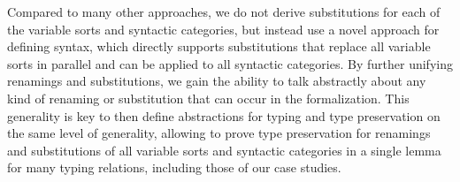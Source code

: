\documentclass[a4paper, UKenglish, cleveref, autoref, thm-restate]{lipics-v2021}
\begin{document}
  Compared to many other approaches, we do not derive substitutions
  for each of the variable sorts and syntactic categories, but instead
  use a novel approach for defining syntax, which directly supports
  substitutions that replace all variable sorts in parallel and can be
  applied to all syntactic categories.
  By further unifying renamings and substitutions, we gain the ability
  to talk abstractly about any kind of renaming or substitution that
  can occur in the formalization.
  This generality is key to then define abstractions for typing and
  type preservation on the same level of generality, allowing to prove
  type preservation for renamings and substitutions of all variable
  sorts and syntactic categories in a single lemma for many typing
  relations, including those of our case studies.




  
  



  
\end{document}
